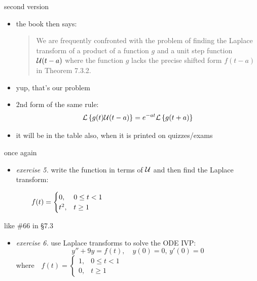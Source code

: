\documentclass[urlcolor=blue,dvipsnames]{beamer}
\begin{document}
\begin{frame}{second version}

\begin{itemize}
\item the book then says:

\small
\begin{quote}
We are frequently confronted with the problem of finding the Laplace transform of a product of a function $g$ and a unit step function $\mathcal{U}(t-a)$ where the function $g$ lacks the precise shifted form $f(t-a)$ in Theorem 7.3.2.
\end{quote}
\normalsize
\item yup, that's our problem
\item 2nd form of the same rule:
    $$\mathcal{L}\left\{g(t)\mathcal{U}(t-a)\right\} = e^{-at} \mathcal{L}\left\{g(t+a)\right\}$$
\item it will be in the table also, when it is printed on quizzes/exams
\end{itemize}
\end{frame}


\begin{frame}{once again}

\begin{itemize}
\item \emph{exercise 5.}  write the function in terms of $\mathcal{U}$ and then find the Laplace transform:

\vspace{-3mm}
    $$f(t) = \begin{cases} 0, & 0 \le t < 1 \\ t^2, & t\ge 1 \end{cases} \hspace{70mm}$$

\vspace{55mm}
\end{itemize}
\end{frame}


\begin{frame}{like \#66 in \S7.3}

\begin{itemize}
\item \emph{exercise 6.}  use Laplace transforms to solve the ODE IVP:
    $$y''+9y=f(t), \quad y(0)=0, \, y'(0)=0$$
where \,\, $\displaystyle f(t) = \begin{cases} 1, & 0 \le t < 1 \\ 0, & t\ge 1 \end{cases}$

\vspace{55mm}
\end{itemize}
\end{frame}
\end{document}
